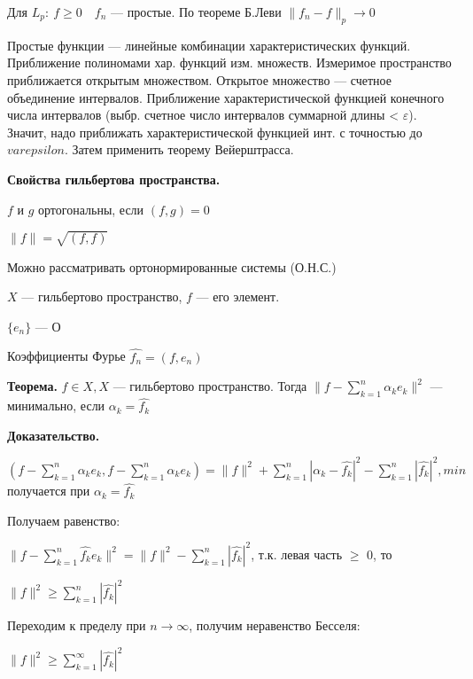 Для $L_p : \: f \geqslant 0 \quad f_n$ --- простые. По теореме
Б.Леви $\|f_n - f\|_p \rightarrow 0$


%
%
%
%
%
%
%
%
%
%
%
Простые функции --- линейные комбинации характеристических
функций. Приближение полиномами хар. функций изм. множеств.
Измеримое пространство приближается открытым множеством. Открытое
множество --- счетное объединение интервалов. Приближение
характеристической функцией конечного числа интервалов (выбр.
счетное число интервалов суммарной длины < $\varepsilon$). Значит,
надо приближать характеристической функцией инт. с точностью до
$varepsilon$. Затем применить теорему Вейерштрасса.

\textbf{Свойства гильбертова пространства.} \quad

$f$ и $g$ ортогональны, если $(f,g) = 0$

$\|f\| = \sqrt{(f,f)}$

Можно рассматривать ортонормированные системы (О.Н.С.)

$X$ --- гильбертово пространство, $f$ ---  его элемент.

$\{e_n\}$ --- О

Коэффициенты Фурье $\hat{f_n} = (f, e_n)$

\textbf{Теорема.} \quad $f \in X, X$ --- гильбертово пространство.
Тогда $\|f - \sum_{k=1}^n \alpha_k e_k\|^2$  --- минимально, если
$\alpha_k = \hat{f_k}$

\textbf{Доказательство.} \quad

$(f - \sum_{k=1}^n \alpha_k e_k, f - \sum_{k=1}^n \alpha_k e_k) =
\|f\|^2 + \sum_{k=1}^n |\alpha_k - \hat{f_k}|^2 - \sum_{k=1}^n
|\hat{f_k}|^2 , min$ получается при $\alpha_k = \hat{f_k}$

Получаем равенство:

$\|f - \sum_{k=1}^n \hat{f_k} e_k\|^2 = \|f\|^2 - \sum_{k=1}^n
|\hat{f_k}|^2$, т.к. левая часть $\geqslant$ 0, то

$\|f\|^2 \geqslant \sum_{k=1}^n |\hat{f_k}|^2$

Переходим к пределу при  $n \rightarrow \infty$, получим
неравенство Бесселя:

$\|f\|^2 \geqslant \sum_{k=1}^\infty |\hat{f_k}|^2$

